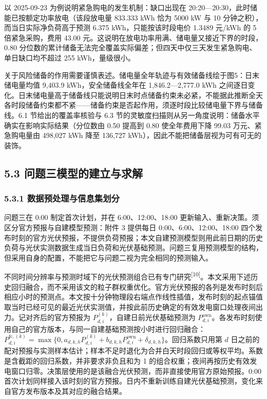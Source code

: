 \documentclass[12pt,a4paper]{ctexart}
\begin{document}
以 2025-09-23 为例说明紧急购电的发生机制：缺口出现在 20:20—20:30，此时储能已按额定功率放电（该段放电量 833.333 kWh 恰为 5000 kW 与 10 分钟之积），而当日实际净负荷高于预测 6.375 kWh，只能按该时段电价 1.3489 元/kWh 的 5 倍紧急采购，费用 43.00 元。这说明在放电功率用满、储电量又接近下界的时段，0.80 分位数的累计储备无法完全覆盖实际偏差；但四天中仅三天发生紧急购电、单日缺口均不超过 255 kWh，量级很小。

关于风险储备的作用需要谨慎表述。储电量全年轨迹与有效储备线绘于图5：日末储电量均值 9,403.9 kWh，安全储备线全年在 1,846.2—2,777.0 kWh 之间逐日变化。日末储电量高于储备线只能说明日末时点储备约束未必紧，不能据此推断全天各时段储备约束都不紧——储备约束是否起作用，须逐时段比较储电量下界与储备线。6.1 节给出的覆盖率核验与 6.3 节的灵敏度扫描则从另一角度说明：储备水平确实在影响实际结果（分位数由 0.50 提高到 0.80 使全年费用下降 99.03 万元、紧急购电量由 498,027 kWh 降至 136,727 kWh），因此不能把储备层视为可有可无的装饰。

\subsection*{5.3 问题三模型的建立与求解}

\subsubsection*{5.3.1 数据预处理与信息集划分}

问题三在 0:00 制定首次计划，并在 6:00、12:00、18:00 更新输入、重新决策。须区分官方预报与自建模型预测：附件 3 提供每日 0:00、6:00、12:00、18:00 四个发布时刻的官方光伏预报，不提供负荷预报；本文自建预测模型则用此前日期的历史负荷与光伏实测数据生成当日负荷和光伏基础预测。问题三复用预测模型的结构，但采用自身的配置，不能把它与问题二视为完全相同的预测输入。

不同时间分辨率与预测时域下的光伏预测组合已有专门研究\textsuperscript{[10]}。本文采用下述历史回归融合，而不采用该文的粒子群权重优化。官方光伏预报的各列是发布时刻后相应小时的预测点。本文按十分钟物理段右端点作线性插值，发布时刻的起点锚值取当时已经可见的最近光伏实测值，并按此前历史确定的有效发电窗口处理夜间出力。记对齐后的官方预报为 $P^{(k)}_{d,i}$，自建日前光伏基础预测为 $P^{\mathrm{own}}_{d,i}$。各发布时刻使用自己的官方版本，与同一自建基础预测按小时进行回归融合：$P^{\mathrm{fc},(k)}_{d,i}=\max\{0,a_{d,k,h}P^{(k)}_{d,i}+b_{d,k,h}P^{\mathrm{own}}_{d,i}+\delta_{d,k,h}\}$。回归系数只用第 $d$ 日之前的配对预报与实测样本估计；样本不足时退化为合并白天时段回归或等权平均。系数是含截距的回归系数，并非要求非负且和为 1 的组合权重；夜间再按历史有效发电窗口归零。决策层使用的是该融合光伏预测，而非直接使用官方原始预报。0:00 首次计划同样接入该时刻的官方预报。日内不重新训练自建光伏基础预测，变化来自官方发布版本及其对应的融合结果。
\end{document}

